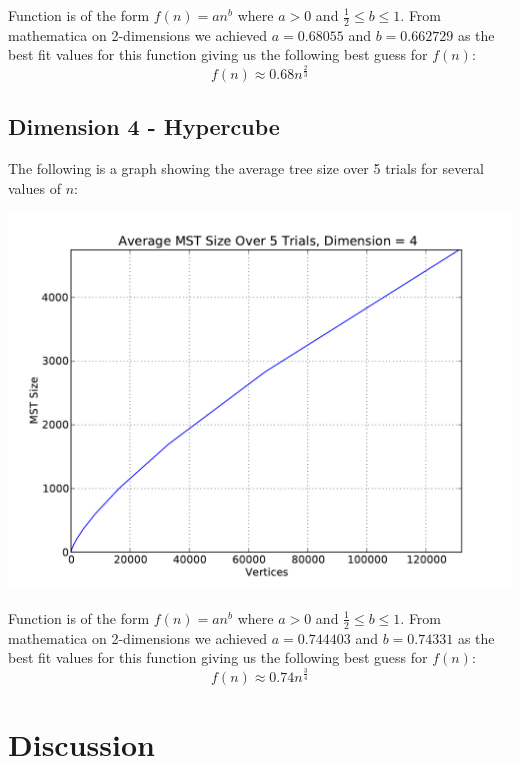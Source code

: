 \documentclass[solution, letterpaper]{cs121}
\begin{document}
Function is of the form $f(n)=an^b$ where $a > 0$ and $\frac{1}{2} \leq b \leq 1$. From mathematica on 2-dimensions we achieved $a=0.68055$ and $b=0.662729$ as the best fit values for this function giving us the following best guess for $f(n)$:
\[f(n) \approx 0.68n^{\frac{2}{3}}\]

\pagebreak
\subsection*{Dimension 4 - Hypercube}

The following is a graph showing the average tree size over 5 trials for several values of $n$:
\begin{center}
\includegraphics[scale=0.8]{graphs/kruskals-dimension-4.pdf}
\end{center}

Function is of the form $f(n)=an^b$ where $a > 0$ and $\frac{1}{2} \leq b \leq 1$. From mathematica on 2-dimensions we achieved $a=0.744403$ and $b=0.74331$ as the best fit values for this function giving us the following best guess for $f(n)$:
\[f(n) \approx 0.74n^{\frac{3}{4}}\]
\pagebreak
\section*{Discussion}
\end{document}
